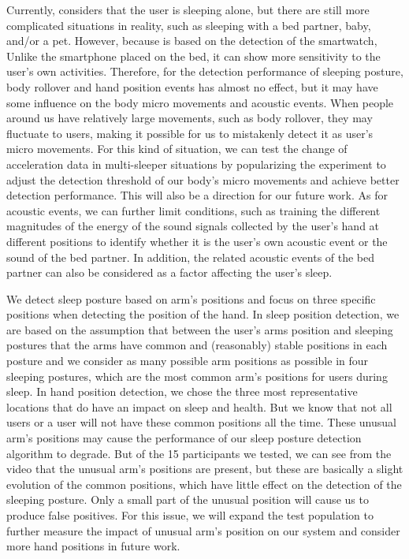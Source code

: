  Currently, {\systemname} considers that the user is sleeping alone, but there are still more complicated situations in reality, such as sleeping with a bed partner, baby, and/or a pet. However, because {\systemname} is based on the detection of the smartwatch, Unlike the smartphone placed on the bed, it can show more sensitivity to the user's own activities. Therefore, for the detection performance of sleeping posture, body rollover and hand position events has almost no effect, but it may have some influence on the body micro movements and acoustic events. When people around us have relatively large movements, such as body rollover, they may fluctuate to users, making it possible for us to mistakenly detect it as user's micro movements. For this kind of situation, we can test the change of acceleration data in multi-sleeper situations by popularizing the experiment to adjust the detection threshold of our body's micro movements and achieve better detection performance. This will also be a direction for our future work. As for acoustic events, we can further limit conditions, such as training the different magnitudes of the energy of the sound signals collected by the user's hand at different positions to identify whether it is the user's own acoustic event or the sound of the bed partner. In addition, the related acoustic events of the bed partner can also be considered as a factor affecting the user's sleep.

 We detect sleep posture based on arm's positions and focus on three specific positions when detecting the position of the hand. In sleep position detection, we are based on the assumption that between the user's arms position and sleeping postures that the arms have common and (reasonably) stable positions in each posture and we consider as many possible arm positions as possible in four sleeping postures, which are the most common arm's positions for users during sleep. In hand position detection, we chose the three most representative locations that do have an impact on sleep and health. But we know that not all users or a user will not have these common positions all the time. These unusual arm's positions may cause the performance of our sleep posture detection algorithm to degrade. But of the 15 participants we tested, we can see from the video that the unusual arm's positions are present, but these are basically a slight evolution of the common positions, which have little effect on the detection of the sleeping posture. Only a small part of the unusual position will cause us to produce false positives. For this issue, we will expand the test population to further measure the impact of unusual arm's position on our system and consider more hand positions in future work.

